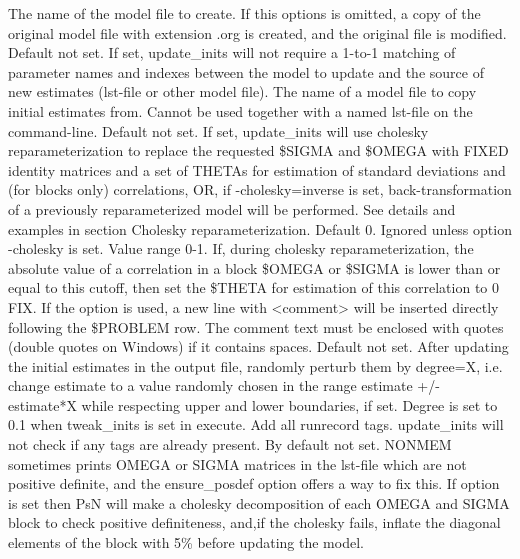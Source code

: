 \begin{optionlist}
The name of the model file to create. If this options is omitted, a copy of
the original model file with extension .org is created, and 
the original file is modified.
\nextopt
{}
Default not set. If set, update\_inits will not require 
a 1-to-1 matching of parameter names and indexes between the model to update and the source
of new estimates (lst-file or other model file).
\nextopt
{}
The name of a model file to copy initial estimates from. 
Cannot be used together with a named lst-file on the command-line.
\nextopt
{}
Default not set.
If set, update\_inits will use cholesky reparameterization to replace the requested
\$SIGMA and \$OMEGA with FIXED identity matrices and a set of THETAs for estimation
of standard deviations and (for blocks only) correlations, OR, if -cholesky=inverse is set,
back-transformation of a previously reparameterized model will be performed. See details and
examples in section Cholesky reparameterization.
\nextopt
{}
Default 0. Ignored unless option -cholesky is set. Value range 0-1.
If, during cholesky reparameterization, the absolute value of a correlation 
in a block \$OMEGA or \$SIGMA is lower than or equal to this cutoff, then set
the \$THETA for estimation of this correlation to 0 FIX.
\nextopt
{}
If the option is used, a new line with <comment> will be inserted 
directly following the \$PROBLEM row.
The comment text must be enclosed with quotes (double quotes on Windows) 
if it contains spaces.
\nextopt
{}
Default not set. 
After updating the initial estimates in the output file, randomly
perturb them by degree=X, i.e. change estimate to a value
randomly chosen in the range estimate +/- estimate*X while
respecting upper and lower boundaries, if set.
Degree is set to 0.1 when tweak\_inits is set in execute.
\nextopt
{}
Add all runrecord tags. update\_inits will not check if any tags 
are already present.
\nextopt
{}
By default not set. 
NONMEM sometimes prints OMEGA or SIGMA matrices
in the lst-file which are not positive definite, and the 
ensure\_posdef option offers a way to fix this.
If option is set then PsN will make a cholesky decomposition of
each OMEGA and SIGMA block to check positive definiteness, and,if the cholesky fails,
inflate the diagonal elements of the block with 5\% before updating the model.

\end{optionlist}
